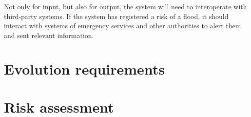 Not only for input, but also for output, the system will need to interoperate with third-party systems. If the system has registered a risk of a flood, it should interact with systems of emergency services and other authorities to alert them and sent relevant information.



\section{Evolution requirements}
\section{Risk assessment}

